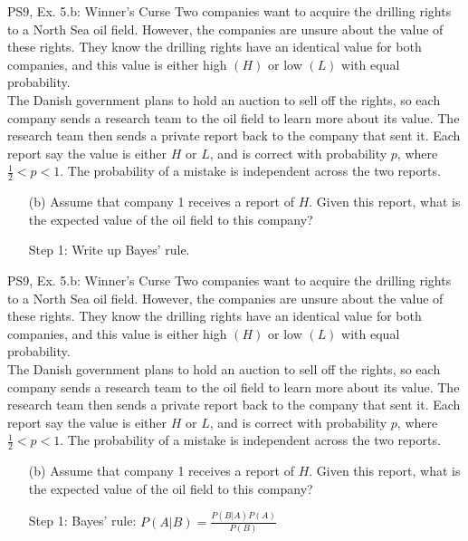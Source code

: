\begin{frame}{PS9, Ex. 5.b: Winner's Curse}
      Two companies want to acquire the drilling rights to a North Sea oil field. However, the companies are unsure about the value of these rights. They know the drilling rights have an identical value for both companies, and this value is either high $(H)$ or low $(L)$ with equal probability.\\\medskip
      The Danish government plans to hold an auction to sell off the rights, so each company sends a research team to the oil field to learn more about its value. The research team then sends a private report back to the company that sent it. Each report say the value is either $H$ or $L$, and is correct with probability $p$, where $\frac{1}{2} < p < 1$. The probability of a mistake is independent across the two reports.
      \begin{itemize}
        \item[(b)] Assume that company 1 receives a report of $H$. Given this report, what is the expected value of the oil field to this company?
        \item[Step 1:] Write up Bayes' rule.
      \end{itemize}
      \vfill\null
\end{frame}
\begin{frame}{PS9, Ex. 5.b: Winner's Curse}
      Two companies want to acquire the drilling rights to a North Sea oil field. However, the companies are unsure about the value of these rights. They know the drilling rights have an identical value for both companies, and this value is either high $(H)$ or low $(L)$ with equal probability.\\\medskip
      The Danish government plans to hold an auction to sell off the rights, so each company sends a research team to the oil field to learn more about its value. The research team then sends a private report back to the company that sent it. Each report say the value is either $H$ or $L$, and is correct with probability $p$, where $\frac{1}{2} < p < 1$. The probability of a mistake is independent across the two reports.
      \begin{itemize}
        \item[(b)] Assume that company 1 receives a report of $H$. Given this report, what is the expected value of the oil field to this company?
        \item[Step 1:] Bayes' rule: $P(A|B)=\frac{P(B|A)P(A)}{P(B)}$
      \end{itemize}
      \vfill\null
\end{frame}
